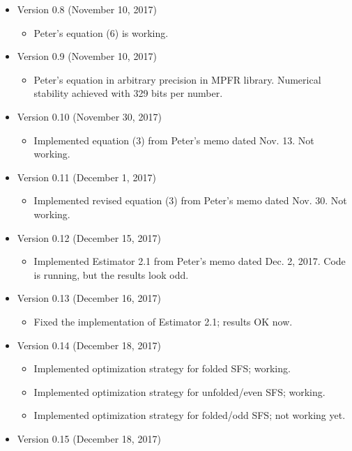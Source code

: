 \documentclass[a4paper]{article}
\begin{document}
\begin{itemize}
\item Version 0.8 (November 10, 2017)
  \begin{itemize}
    \item Peter's equation (6) is working.
  \end{itemize}
\item Version 0.9 (November 10, 2017)
  \begin{itemize}
  \item Peter's equation in arbitrary precision in MPFR
    library. Numerical stability achieved with 329 bits per number.
  \end{itemize}
\item Version 0.10 (November 30, 2017)
  \begin{itemize}
  \item Implemented equation (3) from Peter's memo dated Nov. 13. Not
    working.
  \end{itemize}
\item Version 0.11 (December 1, 2017)
  \begin{itemize}
  \item Implemented revised equation (3) from Peter's memo dated Nov. 30. Not
    working.
  \end{itemize}
\item Version 0.12 (December 15, 2017)
  \begin{itemize}
    \item Implemented Estimator 2.1 from Peter's memo dated Dec. 2,
      2017. Code is running, but the results look odd.
  \end{itemize}
\item Version 0.13 (December 16, 2017)
  \begin{itemize}
  \item Fixed the implementation of Estimator 2.1; results OK now.
  \end{itemize}
\item Version 0.14 (December 18, 2017)
  \begin{itemize}
  \item Implemented optimization strategy for folded SFS; working.
  \item Implemented optimization strategy for unfolded/even SFS;
    working.
  \item Implemented optimization strategy for folded/odd SFS; not
    working yet.
  \end{itemize}
\item Version 0.15 (December 18, 2017)
  \begin{itemize}

\end{itemize}
\end{itemize}
\end{document}
